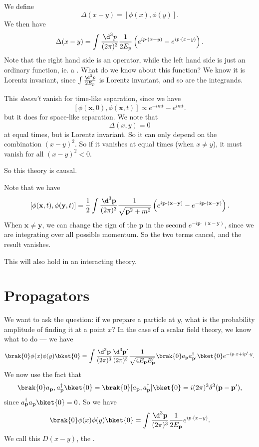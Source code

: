 \documentclass[a4paper]{article}
\begin{document}
We define
\[
  \Delta(x - y) = [\phi(x), \phi(y)].
\]
We then have
\[
  \Delta(x - y) = \int \frac{\d^3 p}{(2\pi)^3} \frac{1}{2 E_p} \left(e^{i p \cdot(x - y)} - e^{ip \cdot (x - y)}\right).
\]
Note that the right hand side is an operator, while the left hand side is just an ordinary function, ie. a . What do we know about this function? We know it is Lorentz invariant, since $\int \frac{\d^3p}{2 E_p}$ is Lorentz invariant, and so are the integrands.

This \emph{doesn't} vanish for time-like separation, since we have
\[
  [\phi(\mathbf{x}, 0), \phi (\mathbf{x}, t)] \propto e^{-imt} - e^{imt}.
\]
but it does for space-like separation. We note that
\[
  \Delta (x, y) = 0
\]
at equal times, but is Lorentz invariant. So it can only depend on the combination $(x - y)^2$. So if it vanishes at equal times (when $x \not= y$), it must vanish for all $(x - y)^2 < 0$.

So this theory is causal.

Note that we have
\[
  [\phi(\mathbf{x}, t), \phi(\mathbf{y}, t)] = \frac{1}{2}\int \frac{\d^3 \mathbf{p}}{(2\pi)^3} \frac{1}{\sqrt{\mathbf{p}^2 + m^2}} \left(e^{i\mathbf{p}\cdot (\mathbf{x} - \mathbf{y})} - e^{-i\mathbf{p}\cdot (\mathbf{x} - \mathbf{y})}\right).
\]
When $\mathbf{x} \not= \mathbf{y}$, we can change the sign of the $\mathbf{p}$ in the second $e^{-i\mathbf{p}\cdot (\mathbf{x} - \mathbf{y})}$, since we are integrating over all possible momentum. So the two terms cancel, and the result vanishes.

This will also hold in an interacting theory.

\section{Propagators}
We want to ask the question: if we prepare a particle at $y$, what is the probability amplitude of finding it at a point $x$? In the case of a scalar field theory, we know what to do --- we have
\[
  \brak{0}\phi(x) \phi(y) \bket{0} = \int \frac{\d^3 \mathbf{p}}{(2\pi)^3} \frac{\d^3 \mathbf{p}'}{(2\pi)^3} \frac{1}{\sqrt{4E_\mathbf{p} E_\mathbf{p}'}} \brak{0}a_\mathbf{p} a_{\mathbf{p}'}^\dagger \bket{0} e^{-i p \cdot x + i p' \cdot y}.
\]
We now use the fact that
\[
  \brak{0}a_\mathbf{p}, a_\mathbf{p}^\dagger\bket{0} = \brak{0}[a_\mathbf{p}, a_\mathbf{p}^\dagger]\bket{0} = i (2\pi)^3 \delta^3 (\mathbf{p} - \mathbf{p}'),
\]
since $a_\mathbf{p}^\dagger a_\mathbf{p} \bket{0} = 0$. So we have
\[
  \brak{0} \phi(x) \phi(y) \bket{0} = \int \frac{\d^3 \mathbf{p}}{(2\pi)^3} \frac{1}{2 E_\mathbf{p}} e^{i p \cdot (x - y)}.
\]
We call this $D(x - y)$, the .
\end{document}
